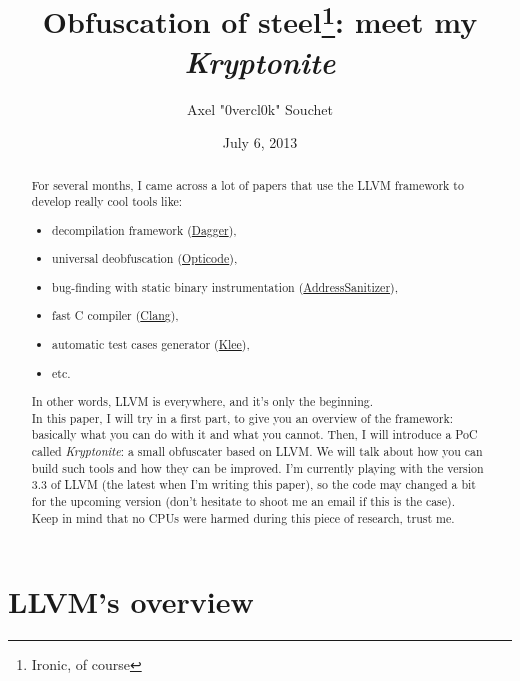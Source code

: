 \documentclass[a4paper, 11pt, notitlepage]{report}
\title{Obfuscation of steel\footnote{Ironic, of course}: meet my \textit{Kryptonite}}
\author{Axel "0vercl0k" Souchet}
\date{July 6, 2013}
\begin{document}
\maketitle
\vspace{2cm}
\begin{abstract}
For several months, I came across a lot of papers that use the LLVM framework to develop really cool tools like:
\begin{itemize}
\item decompilation framework (\href{http://llvm.org/devmtg/2013-04/bougacha-slides.pdf}{Dagger}),
\item universal deobfuscation (\href{http://opticode.coseinc.com/documents/OptiCode_Technical_Details.pdf}{Opticode}),
\item bug-finding with static binary instrumentation (\href{http://clang.llvm.org/docs/AddressSanitizer.html}{AddressSanitizer}),
\item fast C compiler (\href{http://clang.llvm.org/}{Clang}),
\item automatic test cases generator (\href{http://klee.llvm.org/}{Klee}),
\item etc.
\end{itemize}
In other words, LLVM is everywhere, and it's only the beginning.\\
In this paper, I will try in a first part, to give you an overview of the framework: basically what you can do with it and what you cannot. Then, I will introduce a PoC called \textit{Kryptonite}: a small obfuscater based on LLVM. We will talk about how you can build such tools and how they can be improved.
I'm currently playing with the version 3.3 of LLVM (the latest when I'm writing this paper), so the code may changed a bit for the upcoming version (don't hesitate to shoot me an email if this is the case).\\

Keep in mind that no CPUs were harmed during this piece of research, trust me.
\end{abstract}

\setcounter{tocdepth}{4}
\tableofcontents

\newpage
\chapter{LLVM's overview}
\end{document}
